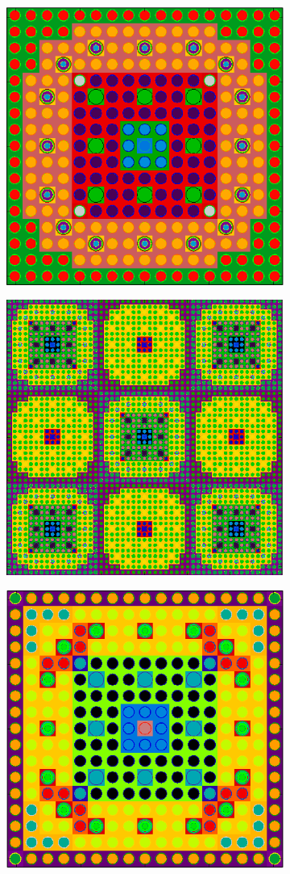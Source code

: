\begin{figure}[h!]
\begin{subfigure}{.5\textwidth}
  \includegraphics[width=.7\linewidth]{figures/workflow/opencg/unique-neighbor-cells-xy-24-16-assm}
  \caption{}
  \label{fig:assm-unique-neighbors}
\end{subfigure}
\begin{subfigure}{.5\textwidth}
  \centering
  \includegraphics[width=.7\linewidth]{figures/workflow/opencg/unique-neighbor-cells-xy-colorset}
  \caption{}
  \label{fig:colorset-unique-neighbors}
\end{subfigure}
\begin{subfigure}{.5\textwidth}
  \centering
  \includegraphics[width=.7\linewidth]{figures/workflow/opencg/neighbor-cells-xy-24-16-assm}

\end{subfigure}
\end{figure}
